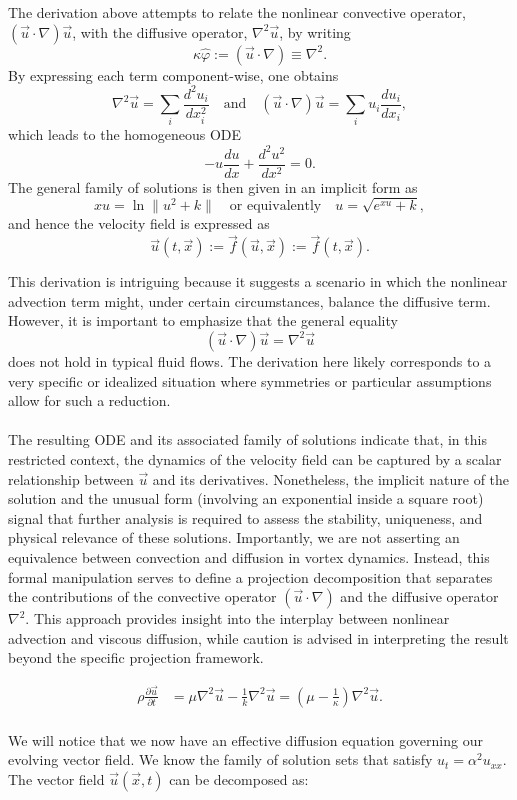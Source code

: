 \documentclass[12pt]{article}
\begin{document}
\begin{remark}
The derivation above attempts to relate the nonlinear convective operator, \((\vec{u}\cdot\nabla)\vec{u}\), with the diffusive operator, \(\nabla^2\vec{u}\), by writing
\[
\kappa \hat \varphi := (\vec{u}\cdot\nabla) \equiv \nabla^{2}.
\]
By expressing each term component-wise, one obtains
\[
\nabla^{2} \vec{u} = \sum_{i} \frac{d^{2} u_{i}}{d x_{i}^{2}} \quad \text{and} \quad (\vec{u} \cdot \nabla) \vec{u} = \sum_{i} u_{i}\frac{d u_{i}}{d x_{i}},
\]
which leads to the homogeneous ODE
\[
- u \frac{du}{dx} + \frac{d^{2}u^{2}}{dx^{2}} = 0.
\]
The general family of solutions is then given in an implicit form as
\[
xu = \ln\|u^{2} + k\| \quad \text{or equivalently} \quad u = \sqrt{e^{xu} + k},
\]
and hence the velocity field is expressed as
\[
\vec{u}(t,\vec{x}) := \vec{f}(\vec{u},\vec{x}) := \vec{f}(t,\vec{x}).
\]

This derivation is intriguing because it suggests a scenario in which the nonlinear advection term might, under certain circumstances, balance the diffusive term. However, it is important to emphasize that the general equality
\[
(\vec{u}\cdot\nabla)\vec{u} = \nabla^2\vec{u}
\]
does not hold in typical fluid flows. The derivation here likely corresponds to a very specific or idealized situation where symmetries or particular assumptions allow for such a reduction. \\\\
The resulting ODE and its associated family of solutions indicate that, in this restricted context, the dynamics of the velocity field can be captured by a scalar relationship between \(\vec u\) and its derivatives. Nonetheless, the implicit nature of the solution and the unusual form (involving an exponential inside a square root) signal that further analysis is required to assess the stability, uniqueness, and physical relevance of these solutions. Importantly, we are not asserting an equivalence between convection and diffusion in vortex dynamics. Instead, this formal manipulation serves to define a projection decomposition that separates the contributions of the convective operator \((\vec{u}\cdot\nabla)\) and the diffusive operator \(\nabla^{2}\). This approach provides insight into the interplay between nonlinear advection and viscous diffusion, while caution is advised in interpreting the result beyond the specific projection framework.
\end{remark} 
\begin{align*}
\rho \frac{\partial \vec{u}}{\partial t} &= \mu \nabla^2 \vec{u} - \frac{1}{k} \nabla^2 \vec{u} = \left(\mu - \frac{1}{\kappa}\right) \nabla^{2} \vec u.
\end{align*} \\ 
We will notice that we now have an effective diffusion equation governing our evolving vector field. We know the family of solution sets that satisfy $u_{t} = \alpha^{2} u_{xx}$. The vector field \(\vec{u}(\vec{x}, t)\) can be decomposed as:
\end{document}
